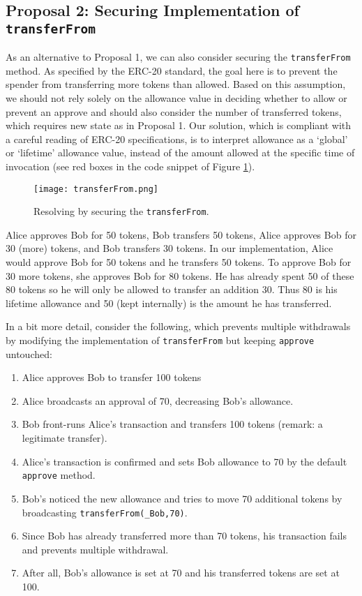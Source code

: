 \subsection{Proposal 2: Securing Implementation of \texttt{transferFrom}}\label{subsec:prop2}
As an alternative to Proposal 1, we can also consider securing the \texttt{transferFrom} method. As specified by the ERC-20 standard, the goal here is to prevent the spender from transferring more tokens than allowed. Based on this assumption, we should not rely solely on the allowance value in deciding whether to allow or prevent an approve and should also consider the number of transferred tokens, which requires new state as in Proposal 1. Our solution, which is compliant with a careful reading of ERC-20 specifications, is to interpret allowance as a `global' or `lifetime' allowance value, instead of the amount allowed at the specific time of invocation (see red boxes in the code snippet of Figure \ref{fig:transfer}). 

\begin{figure}[t]
	\centering
	\texttt{[image: transferFrom.png]}
	\caption[Resolving \mwa in \texttt{transferFrom}]{Resolving \mwa by securing the \texttt{transferFrom}.}
	\label{fig:transfer}
\end{figure}

\begin{example}
	Alice approves Bob for 50 tokens, Bob transfers 50 tokens, Alice approves Bob for 30 (more) tokens, and Bob transfers 30 tokens. In our implementation, Alice would approve Bob for 50 tokens and he transfers 50 tokens. To approve Bob for 30 more tokens, she approves Bob for 80 tokens. He has already spent 50 of these 80 tokens so he will only be allowed to transfer an addition 30. Thus 80 is his lifetime allowance and 50 (kept internally) is the amount he has transferred. 
\end{example}

In a bit more detail, consider the following, which prevents multiple withdrawals by modifying the implementation of \texttt{transferFrom} but keeping \texttt{approve} untouched:
\begin{enumerate}
	\item Alice approves Bob to transfer 100 tokens
	\item Alice broadcasts an approval of 70, decreasing Bob's allowance.
	\item Bob front-runs Alice’s transaction and transfers 100 tokens (remark: a legitimate transfer).
	\item Alice's transaction is confirmed and sets Bob allowance to 70 by the default \texttt{approve} method.
	\item Bob's noticed the new allowance and tries to move 70 additional tokens by broadcasting \texttt{transferFrom(\_Bob,70)}. 
	\item Since Bob has already transferred more than 70 tokens, his transaction fails and prevents multiple withdrawal. 
	\item After all, Bob’s allowance is set at 70 and his transferred tokens are set at 100.
\end{enumerate}

